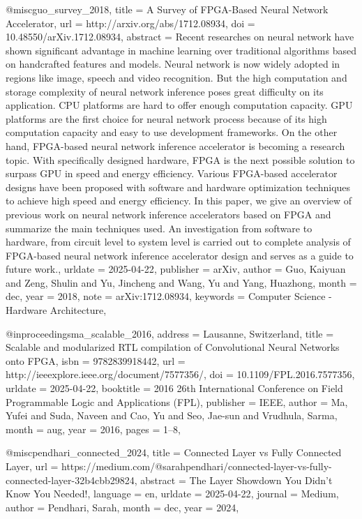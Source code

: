 @misc{guo_survey_2018,
	title = {A {Survey} of {FPGA}-{Based} {Neural} {Network} {Accelerator}},
	url = {http://arxiv.org/abs/1712.08934},
	doi = {10.48550/arXiv.1712.08934},
	abstract = {Recent researches on neural network have shown significant advantage in machine learning over traditional algorithms based on handcrafted features and models. Neural network is now widely adopted in regions like image, speech and video recognition. But the high computation and storage complexity of neural network inference poses great difficulty on its application. CPU platforms are hard to offer enough computation capacity. GPU platforms are the first choice for neural network process because of its high computation capacity and easy to use development frameworks. On the other hand, FPGA-based neural network inference accelerator is becoming a research topic. With specifically designed hardware, FPGA is the next possible solution to surpass GPU in speed and energy efficiency. Various FPGA-based accelerator designs have been proposed with software and hardware optimization techniques to achieve high speed and energy efficiency. In this paper, we give an overview of previous work on neural network inference accelerators based on FPGA and summarize the main techniques used. An investigation from software to hardware, from circuit level to system level is carried out to complete analysis of FPGA-based neural network inference accelerator design and serves as a guide to future work.},
	urldate = {2025-04-22},
	publisher = {arXiv},
	author = {Guo, Kaiyuan and Zeng, Shulin and Yu, Jincheng and Wang, Yu and Yang, Huazhong},
	month = dec,
	year = {2018},
	note = {arXiv:1712.08934},
	keywords = {Computer Science - Hardware Architecture},
}

@inproceedings{ma_scalable_2016,
	address = {Lausanne, Switzerland},
	title = {Scalable and modularized {RTL} compilation of {Convolutional} {Neural} {Networks} onto {FPGA}},
	isbn = {9782839918442},
	url = {http://ieeexplore.ieee.org/document/7577356/},
	doi = {10.1109/FPL.2016.7577356},
	urldate = {2025-04-22},
	booktitle = {2016 26th {International} {Conference} on {Field} {Programmable} {Logic} and {Applications} ({FPL})},
	publisher = {IEEE},
	author = {Ma, Yufei and Suda, Naveen and {Cao, Yu} and Seo, Jae-sun and Vrudhula, Sarma},
	month = aug,
	year = {2016},
	pages = {1--8},
}

@misc{pendhari_connected_2024,
	title = {Connected {Layer} vs {Fully} {Connected} {Layer}},
	url = {https://medium.com/@sarahpendhari/connected-layer-vs-fully-connected-layer-32b4cbb29824},
	abstract = {The Layer Showdown You Didn’t Know You Needed!},
	language = {en},
	urldate = {2025-04-22},
	journal = {Medium},
	author = {Pendhari, Sarah},
	month = dec,
	year = {2024},
}

